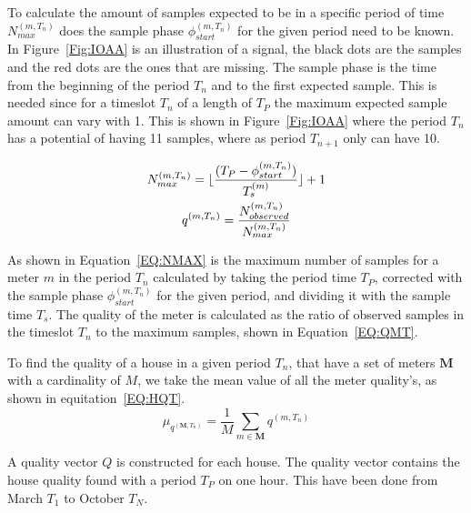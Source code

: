 To calculate the amount of samples expected to be in a specific period of time $N_{max}^{(m,T_n)}$ does the sample phase $\phi_{start}^{(m,T_n)}$ for the given period need to be known. In Figure~\ref{Fig:IOAA} is an illustration of a signal, the black dots are the samples and the red dots are the ones that are missing. The sample phase is the time from the beginning of the period $T_n$ and to the first expected sample. This is needed since for a timeslot $T_n$ of a length of $T_P$ the maximum expected sample amount can vary with 1. This is shown in Figure~\ref{Fig:IOAA} where the period $T_n$ has a potential of having 11 samples, where as period $T_{n+1}$ only can have 10. 

\begin{gather}
		N_{max}^{(m,T_n)} = \lfloor \frac{(T_{P}-\phi_{start}^{(m,T_n)})}{T_s^{(m)}}\rfloor + 1 \label{EQ:NMAX} \\
		q^{(m,T_n)} = \frac{N_{observed}^{(m,T_n)}}{ N_{max}^{(m,T_n)} } \label{EQ:QMT}
\end{gather}

As shown in Equation~\ref{EQ:NMAX} is the maximum number of samples for a meter $m$ in the period $T_n$ calculated by taking the period time $T_P$, corrected with the sample phase $\phi_{start}^{(m,T_n)}$ for the given period, and dividing it with the sample time $T_s$. The  quality of the meter is calculated as the ratio of observed samples in the timeslot $T_n$ to the maximum samples, shown in Equation~\ref{EQ:QMT}. 

To find the quality of a house in a given period $T_n$, that have a set of meters $\mathbf{M}$ with a cardinality of $M$, we take the mean value of all the meter quality's, as shown in equitation~\ref{EQ:HQT}.  
\begin{equation}
	\mu_{q^{(\mathbf{M},T_n)}} = \frac{1}{M} \sum_{m \in \mathbf{M}} q^{(m,T_n)}
	\label{EQ:HQT}
\end{equation}



A quality vector $Q$ is constructed for each house. The quality vector contains the house quality found with a period $T_P$ on one hour. This have been done from March $T_1$ to October $T_N$. 

